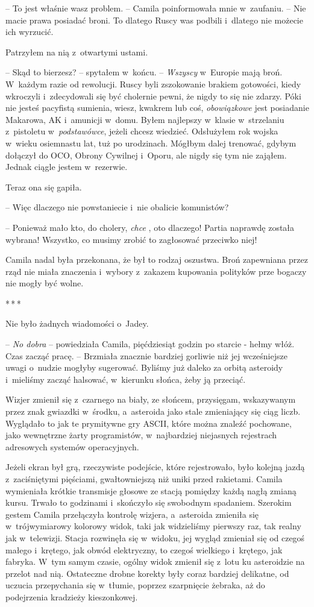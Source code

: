 \documentclass[oneside,polish,12pt,sfheadings]{mwbk}
\newcommand{\threeast}{\bigskip\par\centerline{*\,*\,*}\medskip\par}%
\begin{document}
-- To jest właśnie wasz problem. -- Camila poinformowała mnie w~zaufaniu.
-- Nie macie prawa posiadać broni. To dlatego Ruscy was podbili i~dlatego
nie możecie ich wyrzucić.

Patrzyłem na nią z~otwartymi ustami.

-- Skąd to bierzesz? -- spytałem w~końcu. -- \emph{Wszyscy} w~Europie mają
broń. W~każdym razie od rewolucji. Ruscy byli zszokowanie brakiem
gotowości, kiedy wkroczyli i~zdecydowali się być cholernie pewni, że
nigdy to się nie zdarzy. Póki nie jesteś pacyfistą sumienia, wiesz,
kwakrem lub coś, \emph{obowiązkowe} jest posiadanie Makarowa, AK i~amunicji w~domu. Byłem najlepszy w~klasie w~strzelaniu z~pistoletu w~\emph{podstawówce}, jeżeli chcesz wiedzieć. Odsłużyłem rok wojska w~wieku osiemnastu lat, tuż po urodzinach. Mógłbym dalej trenować, gdybym
dołączył do OCO, Obrony Cywilnej i~Oporu, ale nigdy się tym nie
zająłem. Jednak ciągle jestem w~rezerwie.

Teraz ona się gapiła. 

-- Więc dlaczego nie powstaniecie i~nie obalicie
komunistów?

-- Ponieważ mało kto, do cholery, \emph{chce }, oto dlaczego! Partia
naprawdę została wybrana! Wszystko, co musimy zrobić to zagłosować
przeciwko niej!

Camila nadal była przekonana, że był to rodzaj oszustwa. Broń zapewniana
przez rząd nie miała znaczenia i~wybory z~zakazem kupowania polityków
prze bogaczy nie mogły być wolne.

\threeast

Nie było żadnych wiadomości o~Jadey.

-- \emph{No dobra} -- powiedziała Camila, pięćdziesiąt godzin po starcie -
hełmy włóż. Czas zacząć pracę. -- Brzmiała znacznie bardziej gorliwie niż
jej wcześniejsze uwagi o~nudzie mogłyby sugerować. Byliśmy już daleko za
orbitą asteroidy i~mieliśmy zacząć halsować, w~kierunku słońca, żeby ją
przeciąć.

Wizjer zmienił się z~czarnego na biały, ze słońcem, przysięgam,
wskazywanym przez znak gwiazdki w~środku, a~asteroida jako stale
zmieniający się ciąg liczb. Wyglądało to jak te prymitywne gry ASCII,
które można znaleźć pochowane, jako wewnętrzne żarty programistów, w~najbardziej niejasnych rejestrach adresowych systemów operacyjnych.

Jeżeli ekran był grą, rzeczywiste podejście, które rejestrowało, było
kolejną jazdą z~zaciśniętymi pięściami, gwałtowniejszą niż uniki przed
rakietami. Camila wymieniała krótkie transmisje głosowe ze stacją
pomiędzy każdą nagłą zmianą kursu. Trwało to godzinami i~skończyło się
swobodnym spadaniem. Szerokim gestem Camila przełączyła kontrolę
wizjera, a~asteroida zmieniła się w~trójwymiarowy kolorowy widok, taki
jak widzieliśmy pierwszy raz, tak realny jak w~telewizji. Stacja
rozwinęła się w~widoku, jej wygląd zmieniał się od czegoś małego i~krętego, jak obwód elektryczny, to czegoś wielkiego i~krętego, jak
fabryka. W~tym samym czasie, ogólny widok zmienił się z~lotu ku
asteroidzie na przelot nad nią. Ostateczne drobne korekty były coraz
bardziej delikatne, od uczucia przepychania się w~tłumie, poprzez
szarpnięcie żebraka, aż do podejrzenia kradzieży kieszonkowej.
\end{document}
